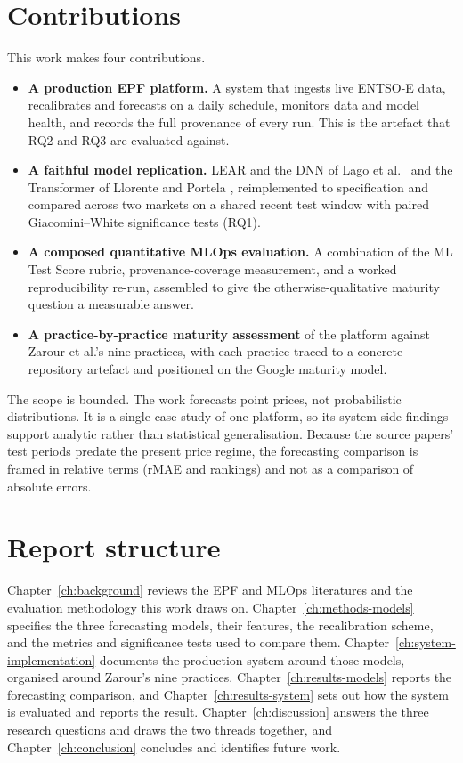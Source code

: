 \section{Contributions}

This work makes four contributions.

\begin{itemize}
  \item \textbf{A production EPF platform.} A system that ingests
    live ENTSO-E data, recalibrates and forecasts on a daily schedule, monitors
    data and model health, and records the full provenance of every run. This is
    the artefact that RQ2 and RQ3 are evaluated against.
  \item \textbf{A faithful model replication.} LEAR and the DNN of Lago et al.\
    \cite{lago2021} and the Transformer of Llorente and Portela
    \cite{llorente2025transformer}, reimplemented to specification and compared
    across two markets on a shared recent test window with paired
    Giacomini--White significance tests (RQ1).
  \item \textbf{A composed quantitative MLOps evaluation.} A combination of the
    ML Test Score rubric, provenance-coverage measurement, and a worked
    reproducibility re-run, assembled to give the otherwise-qualitative maturity
    question a measurable answer.
  \item \textbf{A practice-by-practice maturity assessment} of the platform
    against Zarour et al.'s nine practices, with each practice traced to a
    concrete repository artefact and positioned on the Google maturity model.
\end{itemize}

The scope is bounded. The work forecasts point prices, not
probabilistic distributions. It is a single-case study of one platform, so its
system-side findings support analytic rather than statistical generalisation.
Because the source papers' test periods predate the present price regime, the
forecasting comparison is framed in relative terms (rMAE and rankings) and not as
a comparison of absolute errors.

\section{Report structure}

Chapter~\ref{ch:background} reviews the EPF and MLOps literatures and the
evaluation methodology this work draws on. Chapter~\ref{ch:methods-models}
specifies the three forecasting models, their features, the recalibration
scheme, and the metrics and significance tests used to compare them.
Chapter~\ref{ch:system-implementation} documents the production system around
those models, organised around Zarour's nine practices.
Chapter~\ref{ch:results-models} reports the forecasting comparison, and
Chapter~\ref{ch:results-system} sets out how the system is evaluated and reports
the result. Chapter~\ref{ch:discussion} answers the three research questions and
draws the two threads together, and Chapter~\ref{ch:conclusion} concludes and
identifies future work.
